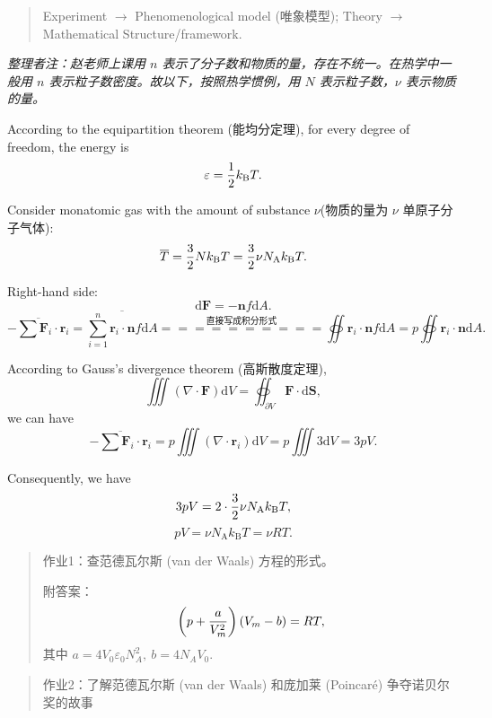 \begin{quote}
Experiment $\to$ Phenomenological model (唯象模型);
Theory $\to$ Mathematical Structure/framework.
\end{quote}

\emph{整理者注：赵老师上课用 \(n\)
表示了分子数和物质的量，存在不统一。在热学中一般用 \(n\)
表示粒子数密度。故以下，按照热学惯例，用 \(N\) 表示粒子数，\(\nu\)
表示物质的量。}

According to the equipartition theorem (能均分定理), for every degree of
freedom, the energy is \[\varepsilon = {1 \over 2} k_\mathrm{B}T.\]

Consider monatomic gas with the amount of substance \(\nu\)(物质的量为
\(\nu\) 单原子分子气体):
\[\overline{T} = {3 \over 2} N k_\mathrm{B} T = {3 \over 2} \nu N_\mathrm{A} k_\mathrm{B} T.\]

Right-hand side:
\[\mathrm{d} \boldsymbol{F} = - \boldsymbol{n} f \mathrm{d}A.\]
\[\overline{- \sum \boldsymbol{F}_i \cdot \boldsymbol{r}_i} = \overline{\sum_{i = 1}^{n} \boldsymbol{r}_i \cdot \boldsymbol{n} f \mathrm{d}A} \overset{\text{直接写成积分形式} }{=\!=\!=\!=\!=\!=\!=\!=\!=\!=} \oiint \boldsymbol{r}_i \cdot \boldsymbol{n} f \mathrm{d}A = p \oiint \boldsymbol{r}_i \cdot \boldsymbol{n} \mathrm{d}A.\]

According to Gauss's divergence theorem (高斯散度定理),
\[\iiint (\nabla \cdot \boldsymbol F) \mathrm dV = \oiint_{\partial V} \boldsymbol F \cdot \mathrm d \boldsymbol S,\]
we can have \[\overline{- \sum \boldsymbol{F}_i \cdot \boldsymbol{r}_i} = p \iiint \left( \nabla \cdot \boldsymbol{r}_i \right) \mathrm{d} V = p \iiint 3 \mathrm{d} V = 3pV.\]

Consequently, we have
\[3pV = 2 \cdot {3 \over 2} \nu N_\mathrm{A} k_\mathrm{B} T,\]
\[pV = \nu N_\mathrm{A} k_\mathrm{B} T = \nu RT.\]

\begin{quote}
作业1：查范德瓦尔斯 (van der Waals) 方程的形式。

附答案： \[\left( p + {a \over V_m^2} \right) (V_m - b) = RT,\] 其中
\(a = 4 V_0 \varepsilon_0 N_A^2, \ b = 4N_AV_0.\)
\end{quote}

\begin{quote}
作业2：了解范德瓦尔斯 (van der Waals) 和庞加莱 (Poincaré)
争夺诺贝尔奖的故事
\end{quote}
